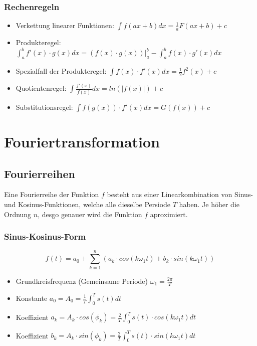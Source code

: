 \subsubsection{Rechenregeln}
\begin{itemize}
  \item Verkettung linearer Funktionen: $\int f(ax+b)dx = \frac{1}{a}F(ax+b) + c$
  \item Produkteregel: $\int_a^b f'(x) \cdot g(x) dx =
    (f(x) \cdot g(x))|^b_a - \int_a^b f(x) \cdot g'(x) dx$
  \item Spezialfall der Produkteregel: $\int f(x) \cdot f'(x) dx = \frac{1}{2}f^2(x) + c$
  \item Quotientenregel: $\int \frac{f'(x)}{f(x)}dx = ln(|f(x)|) + c$
  \item Substitutionsregel: $ \int f(g(x)) \cdot f'(x) dx = G(f(x)) + c$
\end{itemize}


\section{Fouriertransformation}
\subsection{Fourierreihen}
Eine Fourierreihe der Funktion $f$ besteht aus einer Linearkombination
von Sinus- und Kosinus-Funktionen, welche alle dieselbe Persiode $T$
haben. Je höher die Ordnung $n$, desgo genauer wird die Funktion $f$ aproximiert.

\subsubsection{Sinus-Kosinus-Form}
\[
  f(t) = a_0 + \sum_{k=1}^{n}
  (a_k \cdot cos(k \omega_1 t) + b_k \cdot sin(k \omega_1 t))
\]
\begin{itemize}
  \item Grundkreisfrequenz (Gemeinsame Periode) $\omega_1 = \frac{2\pi}{T}$
  \item Konstante $a_0 = A_0 = \frac{1}{T}\int_0^T s(t) dt$
  \item Koeffizient $a_k = A_k \cdot cos(\phi_k) =
    \frac{2}{T} \int_0^T s(t) \cdot cos(k \omega_1 t) dt$
  \item Koeffizient $b_k = A_k \cdot sin(\phi_k) =
    \frac{2}{T} \int_0^T s(t) \cdot sin(k \omega_1 t) dt$
\end{itemize}

